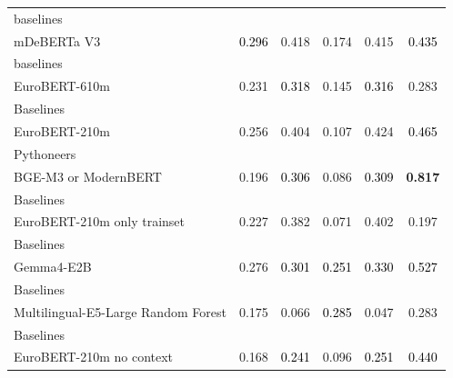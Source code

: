 \begin{tabularx}{\textwidth}{X | c c c c c}
baselines\\\subcatarrow{}mDeBERTa V3 & \textcolor{Black}{0.296} & \textcolor{White!50!BrickRed}{0.418} & \textcolor{White!50!NavyBlue}{0.174} & \textcolor{White!50!BrickRed}{0.415} & \textcolor{Black}{0.435} \\
baselines\\\subcatarrow{}EuroBERT-610m & \textcolor{White!50!NavyBlue}{0.231} & \textcolor{Black}{0.318} & \textcolor{White!50!NavyBlue}{0.145} & \textcolor{Black}{0.316} & \textcolor{White!50!NavyBlue}{0.283} \\
Baselines\\\subcatarrow{}EuroBERT-210m & \textcolor{White!50!NavyBlue}{0.256} & \textcolor{White!50!BrickRed}{0.404} & \textcolor{NavyBlue}{0.107} & \textcolor{White!50!BrickRed}{0.424} & \textcolor{Black}{0.465} \\
Pythoneers\\\subcatarrow{}BGE-M3 or ModernBERT & \textcolor{NavyBlue}{0.196} & \textcolor{Black}{0.306} & \textcolor{NavyBlue}{0.086} & \textcolor{Black}{0.309} & \textbf{\textcolor{BrickRed}{0.817}} \\
Baselines\\\subcatarrow{}EuroBERT-210m only trainset & \textcolor{White!50!NavyBlue}{0.227} & \textcolor{White!50!BrickRed}{0.382} & \textcolor{NavyBlue}{0.071} & \textcolor{White!50!BrickRed}{0.402} & \textcolor{NavyBlue}{0.197} \\
Baselines\\\subcatarrow{}Gemma4-E2B & \textcolor{White!50!NavyBlue}{0.276} & \textcolor{Black}{0.301} & \textcolor{Black}{0.251} & \textcolor{Black}{0.330} & \textcolor{Black}{0.527} \\
Baselines\\\subcatarrow{}Multilingual-E5-Large Random Forest & \textcolor{NavyBlue}{0.175} & \textcolor{NavyBlue}{0.066} & \textcolor{Black}{0.285} & \textcolor{NavyBlue}{0.047} & \textcolor{White!50!NavyBlue}{0.283} \\
Baselines\\\subcatarrow{}EuroBERT-210m no context & \textcolor{NavyBlue}{0.168} & \textcolor{Black}{0.241} & \textcolor{NavyBlue}{0.096} & \textcolor{Black}{0.251} & \textcolor{Black}{0.440} \\
\hline
\end{tabularx}